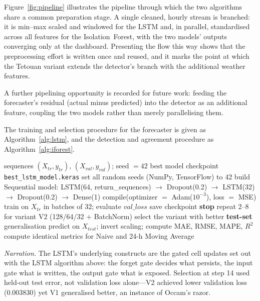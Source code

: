\documentclass[11pt,a4paper]{article}
\begin{document}
Figure~\ref{fig:pipeline} illustrates the pipeline through which the two algorithms share a common preparation stage. A single cleaned, hourly stream is branched: it is min--max scaled and windowed for the LSTM and, in parallel, standardised across all features for the Isolation~Forest, with the two models' outputs converging only at the dashboard. Presenting the flow this way shows that the preprocessing effort is written once and reused, and it marks the point at which the Tetouan variant extends the detector's branch with the additional weather features.

A further pipelining opportunity is recorded for future work: feeding
the forecaster's residual (actual minus predicted) into the detector as an
additional feature, coupling the two models rather than merely parallelising
them.

The training and selection procedure for the forecaster is given as
Algorithm~\ref{alg:lstm}, and the detection and agreement procedure as
Algorithm~\ref{alg:iforest}.

\begin{algorithm}[H]
\caption{LSTM demand forecaster: training, early stopping, and variant selection.}
\label{alg:lstm}
\begin{algorithmic}[1]
\Require sequences $(X_{tr},y_{tr})$, $(X_{val},y_{val})$; seed $=42$
\Ensure best model checkpoint \texttt{best\_lstm\_model.keras}
\State set all random seeds (NumPy, TensorFlow) to 42
\State build Sequential model: LSTM(64, return\_sequences) $\to$ Dropout(0.2)
       $\to$ LSTM(32) $\to$ Dropout(0.2) $\to$ Dense(1) 
\State compile(optimizer $=$ Adam($10^{-3}$), loss $=$ MSE)
  \State train on $X_{tr}$ in batches of 32; evaluate $val\_loss$
   \State save checkpoint \EndIf
   \State \textbf{stop}  \EndIf
\EndFor
\State repeat 2--8 for variant V2 (128/64/32 $+$ BatchNorm)
\State select the variant with better \textbf{test-set} generalisation 
\State predict on $X_{test}$; invert scaling; compute MAE, RMSE, MAPE, $R^2$
\State compute identical metrics for Naive and 24-h Moving Average
\end{algorithmic}
\end{algorithm}
\noindent\textit{Narration.} The LSTM's underlying constructs are the gated
cell updates set out with the LSTM algorithm above: the forget gate decides what
persists, the input gate what is written, the output gate what is exposed.
Selection at step 14 used held-out test error, not validation loss alone---V2
achieved lower validation loss (0.003830) yet V1 generalised better, an
instance of Occam's razor.
\end{document}
